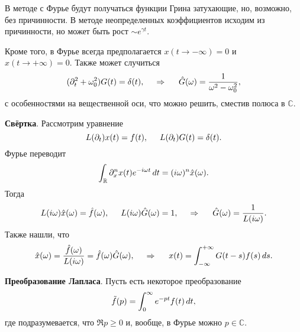 В методе с Фурье будут получаться функции Грина затухающие, но, возможно, без причинности. 
В методе неопределенных коэффициентов исходим из причинности, но может быть рост $\sim e^{\gamma t}$. 


Кроме того, в Фурье всегда предполагается $x(t \to - \infty) = 0$ и $x(t \to + \infty) = 0$. Также может случиться
\begin{equation*}
    (\partial_t^2 + \omega_0^2) G(t) = \delta(t),
    \hspace{0.5cm} \Rightarrow \hspace{0.5cm}
    \hat{G}(\omega) = \frac{1}{\omega^2 - \omega_0^2},
\end{equation*}
с особенностями на вещественной оси, что можно решить, сместив полюса в $\mathbb{C}$.





\textbf{Свёртка}. Рассмотрим уравнение
\begin{equation*}
    L(\partial_t) x(t) = f(t),
    \hspace{5 mm} 
    L(\partial_t) G(t) = \delta(t).
\end{equation*}
Фурье переводит 
\begin{equation*}
    \int_{\mathbb{R}} \partial_x^n x(t) e^{- i \omega t} \, d t = (i \omega)^n \hat{x} (\omega).
\end{equation*}
Тогда
\begin{equation*}
    L(i \omega) \hat{x} (\omega) = \hat{f}(\omega),
    \hspace{5 mm} 
    L(i \omega)  \hat{G} (\omega) = 1,
    \hspace{0.5cm} \Rightarrow \hspace{0.5cm}
    \hat{G}(\omega) = \frac{1}{L(i \omega)}.
\end{equation*}
Также нашли, что
\begin{equation*}
    \hat{x}(\omega) = \frac{\hat{f}(\omega)}{L(i \omega)} = \hat{f}(\omega) \hat{G}(\omega),
    \hspace{0.5cm} \Rightarrow \hspace{0.5cm}
    x(t) = \int_{-\infty}^{+\infty} G(t-s) f(s) \, d s.
\end{equation*}



\textbf{Преобразование Лапласа}. Пусть есть некоторое преобразование
\begin{equation*}
    \tilde{f}(p) = \int_0^{\infty} e^{- p t} f(t) \, d t,
\end{equation*}
где подразумевается, что $\Re p \geq 0$ и, вообще, в Фурье можно $p \in \mathbb{C}$. 

